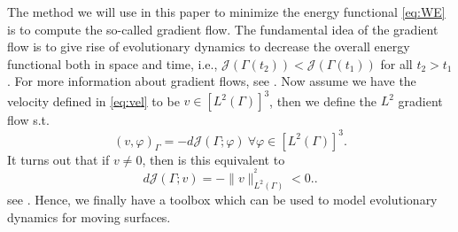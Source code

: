 The method we will use in this paper to minimize the energy functional \eqref{eq:WE} is to compute the so-called gradient flow. The fundamental idea of the gradient flow is to give rise of evolutionary dynamics to decrease the overall energy
functional both in space and time, i.e., $\mathcal{J}\left( \Gamma \left( t_{2} \right)  \right) <   \mathcal{J}\left( \Gamma \left( t_{1} \right)\right)$ for all  $t_{2} > t_{1}$. For more information about gradient flows, see
    \cite{dogan2007discrete, dogan2005finite}. Now assume we have the velocity defined in \eqref{eq:vel} to be $v \in \left[ L^{2}\left( \Gamma  \right)  \right]^3 $, then we define the $L^2$  gradient flow s.t. \[
      \left( v,\varphi  \right) _{\Gamma  }  = - d \mathcal{J} \left( \Gamma ; \varphi  \right) \  \forall \varphi \in \left[ L^2\left( \Gamma  \right)   \right] ^3.
    \]
    It turns out that if $v \neq 0$, then is this equivalent to
    \begin{equation}
    \label{eq:gradient_flow}
d \mathcal{J} \left( \Gamma ; v \right) = -\| v \|_{ L^2\left( \Gamma  \right)  }^{^2  } < 0.
    .\end{equation}
see \cite{ito2008variational}.
Hence, we finally have a toolbox which can be used to model evolutionary dynamics for moving surfaces.











